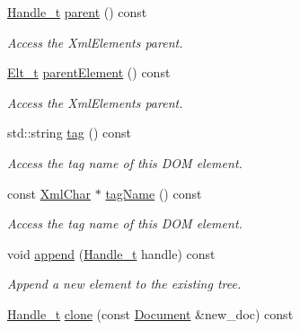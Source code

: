 \begin{DoxyCompactItemize}
\hyperlink{class_d_d4hep_1_1_x_m_l_1_1_handle__t}{Handle\_\-t} \hyperlink{class_d_d4hep_1_1_x_m_l_1_1_element_ae14a8da9743a833f4ca1947c40e5b666}{parent} () const 
\begin{DoxyCompactList}\small\item\em Access the XmlElements parent. \item\end{DoxyCompactList}\item 
\hyperlink{class_d_d4hep_1_1_x_m_l_1_1_element_af63782f6873c3d8c9b28e1777cde9275}{Elt\_\-t} \hyperlink{class_d_d4hep_1_1_x_m_l_1_1_element_ae691ae85a47f597002426bbb00aa5957}{parentElement} () const 
\begin{DoxyCompactList}\small\item\em Access the XmlElements parent. \item\end{DoxyCompactList}\item 
std::string \hyperlink{class_d_d4hep_1_1_x_m_l_1_1_element_a2da8bfac1f2834e3cc5dd64dd7566a6e}{tag} () const 
\begin{DoxyCompactList}\small\item\em Access the tag name of this DOM element. \item\end{DoxyCompactList}\item 
const \hyperlink{namespace_d_d4hep_1_1_x_m_l_a09e5d9cc86ed782f6826dfe0778c1815}{XmlChar} $\ast$ \hyperlink{class_d_d4hep_1_1_x_m_l_1_1_element_ab1d76bcd1cbc41188317d0d6cdf9fd6b}{tagName} () const 
\begin{DoxyCompactList}\small\item\em Access the tag name of this DOM element. \item\end{DoxyCompactList}\item 
void \hyperlink{class_d_d4hep_1_1_x_m_l_1_1_element_ac6be868dcd489b0756e3c70511d3605f}{append} (\hyperlink{class_d_d4hep_1_1_x_m_l_1_1_handle__t}{Handle\_\-t} handle) const 
\begin{DoxyCompactList}\small\item\em Append a new element to the existing tree. \item\end{DoxyCompactList}\item 
\hyperlink{class_d_d4hep_1_1_x_m_l_1_1_handle__t}{Handle\_\-t} \hyperlink{class_d_d4hep_1_1_x_m_l_1_1_element_a0f11a4fda55875a9998c4c5ce4c5943e}{clone} (const \hyperlink{class_d_d4hep_1_1_x_m_l_1_1_document}{Document} \&new\_\-doc) const 

\end{DoxyCompactItemize}

